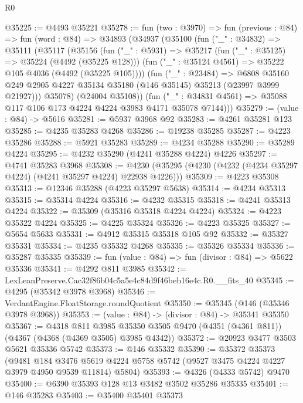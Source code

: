 \begin{lexlean}{R0}
\begin{coremodule}
@35225 := @4493 @35221
@35278 := fun (two : @3970) =>
  fun (previous : @84) =>
  fun (word : @84) =>
  @34893
    (@34937
      (@35100
        (fun ("_" : @34832) =>
        @35111
          (@35117
            (@35156
              (fun ("_" : @5931) =>
              @35217
                (fun ("_" : @35125) => @35224 (@4492 (@35225 @128)))
                (fun ("_" : @35124 @4561) => @35222 @105 @4036 (@4492 (@35225 @105))))
              (fun ("_" : @23484) =>
              @6808
                @35160
                @249
                @2905
                @4227
                @35134
                @35180
                (@146 @35145)
                @35213
                (@23997 @3999 @21927)))
            @35078)
          (@24004 @35108))
        (fun ("_" : @34831 @4561) => @35088 @117 @106 @173 @4224 @4224 @3983 @4171 @35078 @7144)))
@35279 := (value : @84) -> @5616
@35281 := @5937 @3968 @92
@35283 := @4261 @35281 @123
@35285 := @4235 @35283 @4268
@35286 := @19238 @35285
@35287 := @4223 @35286
@35288 := @5921 @35283
@35289 := @4234 @35288
@35290 := @35289 @4224
@35295 := @4232 @35290 (@4241 @35288 @4224) @4226
@35297 := @4741 @35283 @3968
@35308 := @4230 (@35295 (@4230 (@4232 (@4234 @35297 @4224) (@4241 @35297 @4224) @22938 @4226)))
@35309 := @4223 @35308
@35313 := @12346 @35288 (@4223 @35297 @5638)
@35314 := @4234 @35313
@35315 := @35314 @4224
@35316 := @4232 @35315
@35318 := @4241 @35313 @4224
@35322 := @35309 (@35316 @35318 @4224 @4224)
@35324 := @4223 @35322 @4224
@35325 := @4225 @35324
@35326 := @4223 @35325
@35327 := @5654 @5633
@35331 := @4912 @35315 @35318 @105 @92
@35332 := @35327 @35331
@35334 := @4235 @35332 @4268
@35335 := @35326 @35334
@35336 := @35287 @35335
@35339 := fun (value : @84) => fun (divisor : @84) => @5622 @35336
@35341 := @4292 @811 @3985
@35342 := LexLeanPreserve.Cac32f86b04c5a5e4c84d9f46beb16e4c.R0.__fits_40
@35345 := @4295 (@35342 @3978 @3968)
@35346 := VerdantEngine.FloatStorage.roundQuotient
@35350 := @35345 (@146 (@35346 @3978 @3968))
@35353 := (value : @84) -> (divisor : @84) -> @35341 @35350
@35367 := @4318
    @811
    @3985
    @35350
    @3505
    @9470
    (@4351 (@4361 @811))
    (@4367 (@4368 (@4369 @3505) @3985 @4342))
@35372 := @20923 @3477 @3503 @5621 @35336 @5742
@35373 := @146 @35332
@35390 := @35372
    @35373
    (@9481
      @184
      @3476
      @5619
      @4224
      @5758
      @5742
      (@9527 @3475 @4224 @4227 @3979 @4950 @9539 @11814)
      @5804)
@35393 := @4326 (@4333 @5742) @9470
@35400 := @6390 @35393 @128 @13 @3482 @3502 @35286 @35335
@35401 := @146 @35283
@35403 := @35400 @35401 @35373

\end{coremodule}
\end{lexlean}
